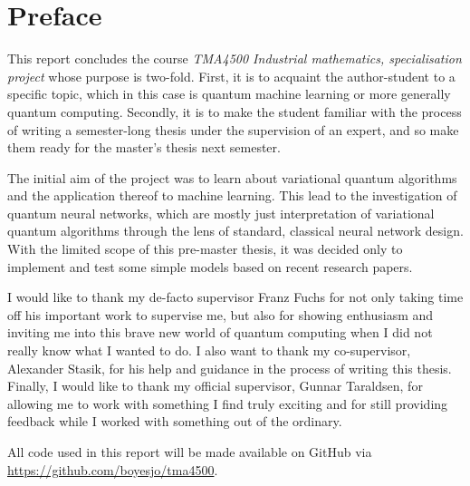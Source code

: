\section*{Preface}
This report concludes the course \textit{TMA4500 Industrial mathematics, specialisation project} whose purpose is two-fold.
First, it is to acquaint the author-student to a specific topic, which in this case is quantum machine learning or more generally quantum computing.
Secondly, it is to make the student familiar with the process of writing a semester-long thesis under the supervision of an expert, and so make them ready for the master's thesis next semester.

The initial aim of the project was to learn about variational quantum algorithms and the application thereof to machine learning.
This lead to the investigation of quantum neural networks, which are mostly just interpretation of variational quantum algorithms through the lens of standard, classical neural network design.
With the limited scope of this pre-master thesis, it was decided only to implement and test some simple models based on recent research papers.

I would like to thank my de-facto supervisor Franz Fuchs for not only taking time off his important work to supervise me, but also for showing enthusiasm and inviting me into this brave new world of quantum computing when I did not really know what I wanted to do.
I also want to thank my co-supervisor, Alexander Stasik, for his help and guidance in the process of writing this thesis.
Finally, I would like to thank my official supervisor, Gunnar Taraldsen, for allowing me to work with something I find truly exciting and for still providing feedback while I worked with something out of the ordinary.

All code used in this report will be made available on GitHub via \url{https://github.com/boyesjo/tma4500}.



\cleardoublepage